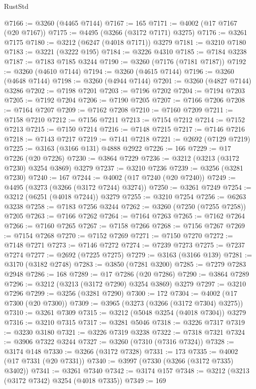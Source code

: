 \begin{lexlean}{RustStd}
\begin{coremodule}
{\begin{coremodule}
{{{{{{{{{{{{{{{{{{{{{{{{{{@7166 := @3260 (@4465 @7144)
@7167 := 165
@7171 := @4002 (@17 @7167 (@20 @7167))
@7175 := @4495 (@3266 (@3172 @7171) @3275)
@7176 := @3261 @7175
@7180 := @3212 (@6247 (@4018 @7171)) @3279
@7181 := @3210 @7180
@7183 := @3221 (@3222 @195)
@7184 := @3226 @4310
@7185 := @7184 @3238
@7187 := @7183 @7185 @3244
@7190 := @3260 (@7176 (@7181 @7187))
@7192 := @3260 (@4610 @7144)
@7194 := @3260 (@4615 @7144)
@7196 := @3260 (@4648 @7144)
@7198 := @3260 (@4944 @7144)
@7201 := @3260 (@4827 @7144) @3286
@7202 := @7198 @7201
@7203 := @7196 @7202
@7204 := @7194 @7203
@7205 := @7192 @7204
@7206 := @7190 @7205
@7207 := @7166 @7206
@7208 := @7164 @7207
@7209 := @7162 @7208
@7210 := @7160 @7209
@7211 := @7158 @7210
@7212 := @7156 @7211
@7213 := @7154 @7212
@7214 := @7152 @7213
@7215 := @7150 @7214
@7216 := @7148 @7215
@7217 := @7146 @7216
@7218 := @7143 @7217
@7219 := @7141 @7218
@7221 := @2692 (@7129 @7219)
@7225 := @3163 (@3166 @131) @4888 @2922
@7226 := 166
@7229 := @17 @7226 (@20 @7226)
@7230 := @3864 @7229
@7236 := @3212 (@3213 (@3172 @7230) @3254 @3869) @3279
@7237 := @3210 @7236
@7239 := @3256 (@3281 @7230)
@7240 := 167
@7244 := @4002 (@17 @7240 (@20 @7240))
@7249 := @4495 (@3273 (@3266 (@3172 @7244) @3274))
@7250 := @3261 @7249
@7254 := @3212 (@6251 (@4018 @7244)) @3279
@7255 := @3210 @7254
@7256 := @6263 @3238
@7258 := @7183 @7256 @3244
@7262 := @3260 (@7250 (@7255 @7258)) @7205
@7263 := @7166 @7262
@7264 := @7164 @7263
@7265 := @7162 @7264
@7266 := @7160 @7265
@7267 := @7158 @7266
@7268 := @7156 @7267
@7269 := @7154 @7268
@7270 := @7152 @7269
@7271 := @7150 @7270
@7272 := @7148 @7271
@7273 := @7146 @7272
@7274 := @7239 @7273
@7275 := @7237 @7274
@7277 := @2692 (@7225 @7275)
@7279 := @3163 (@3166 @139)
@7281 := @3170 (@3182 @2748)
@7283 := @3850 (@7281 @3200)
@7285 := @7279 @7283 @2948
@7286 := 168
@7289 := @17 @7286 (@20 @7286)
@7290 := @3864 @7289
@7296 := @3212 (@3213 (@3172 @7290) @3254 @3869) @3279
@7297 := @3210 @7296
@7299 := @3256 (@3281 @7290)
@7300 := 172
@7304 := @4002 (@17 @7300 (@20 @7300))
@7309 := @3965 (@3273 (@3266 (@3172 @7304) @3275))
@7310 := @3261 @7309
@7315 := @3212 (@5048 @3254 (@4018 @7304)) @3279
@7316 := @3210 @7315
@7317 := @3281 @5046
@7318 := @3226 @7317
@7319 := @3230 @3180
@7321 := @3226 @7319 @3238
@7322 := @7318 @7321
@7324 := @3906 @7322 @3244
@7327 := @3260 (@7310 (@7316 @7324))
@7328 := @3174 @148
@7330 := @3266 (@3172 @7328)
@7331 := 173
@7335 := @4002 (@17 @7331 (@20 @7331))
@7340 := @3997 (@7330 (@3266 (@3172 @7335) @3402))
@7341 := @3261 @7340
@7342 := @3174 @157
@7348 := @3212 (@3213 (@3172 @7342) @3254 (@4018 @7335))
@7349 := 169
}}}}}}}}}}}}}}}}}}}}}}}}}}
\end{coremodule}}
\end{coremodule}
\end{lexlean}
